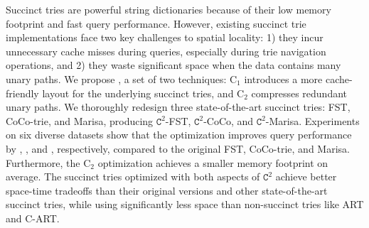 \begin{OPabstract}
  Succinct tries are powerful string dictionaries because of their low memory
  footprint and fast query performance. However, existing succinct trie
  implementations face two key challenges to spatial locality: 1) they incur
  unnecessary cache misses during queries, especially during trie navigation
  operations, and 2) they waste significant space when the data contains many
  unary paths. We propose \csquared, a set of two techniques: $\text{C}_1$
  introduces a more cache-friendly layout for the \bv underlying succinct tries,
  and $\text{C}_2$ compresses redundant unary paths. We thoroughly redesign
  three state-of-the-art succinct tries: FST, CoCo-trie, and Marisa, producing
  $\texttt{C}^2$-FST, $\texttt{C}^2$-CoCo, and $\texttt{C}^2$-Marisa.
  Experiments on six diverse datasets show that the \bvdesign optimization
  improves query performance by \bvfstspeedup, \bvcocospeedup, and \bvmarisaspeedup, respectively,
  compared to the original FST, CoCo-trie, and Marisa.  Furthermore, the
  $\text{C}_2$ optimization achieves a \toplevelspacesavings smaller memory
  footprint on average. The succinct tries optimized with both aspects of
  $\texttt{C}^2$ achieve better space-time tradeoffs than their original
  versions and other state-of-the-art succinct tries, while using significantly
  less space than non-succinct tries like ART and C-ART.
\end{OPabstract}

